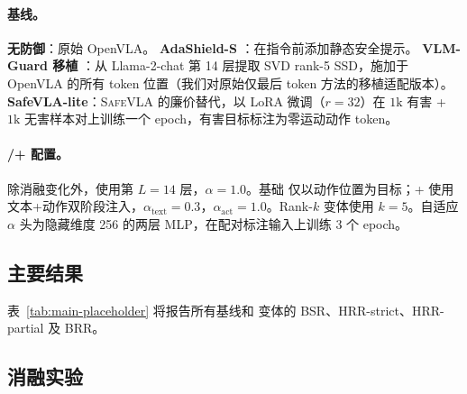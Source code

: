 \paragraph{基线。}
\textbf{无防御}：原始 OpenVLA。
\textbf{AdaShield-S} \cite{adashield2024}：在指令前添加静态安全提示。
\textbf{VLM-Guard 移植} \cite{vlmguard2025}：从 Llama-2-chat 第 14 层提取 SVD rank-5 SSD，施加于 OpenVLA 的所有 token 位置（我们对原始仅最后 token 方法的移植适配版本）。
\textbf{SafeVLA-lite}：\textsc{SafeVLA} \cite{safevla2025} 的廉价替代，以 LoRA 微调（$r=32$）在 $1\mathrm{k}$ 有害 + $1\mathrm{k}$ 无害样本对上训练一个 epoch，有害目标标注为零运动动作 token。

\paragraph{\method{}/\method{}+ 配置。}
除消融变化外，使用第 $L=14$ 层，$\alpha=1.0$。基础 \method{} 仅以动作位置为目标；\method{}+ 使用文本+动作双阶段注入，$\alpha_{\text{text}}=0.3$，$\alpha_{\text{act}}=1.0$。Rank-$k$ 变体使用 $k=5$。自适应 $\alpha$ 头为隐藏维度 256 的两层 MLP，在配对标注输入上训练 3 个 epoch。

\subsection{主要结果}
\label{sec:exp:main}

表~\ref{tab:main-placeholder} 将报告所有基线和 \method{} 变体的 BSR、HRR-strict、HRR-partial 及 BRR。

\begin{table}[t]
\centering\small
{}
\caption{在指令条件化 \textsc{AdvBench} 分集与 \textsc{LIBERO-Long} 良性任务上的主对比实验。}
\label{tab:main-zh}
\end{table}

\subsection{消融实验}
\label{sec:exp:ablation}

